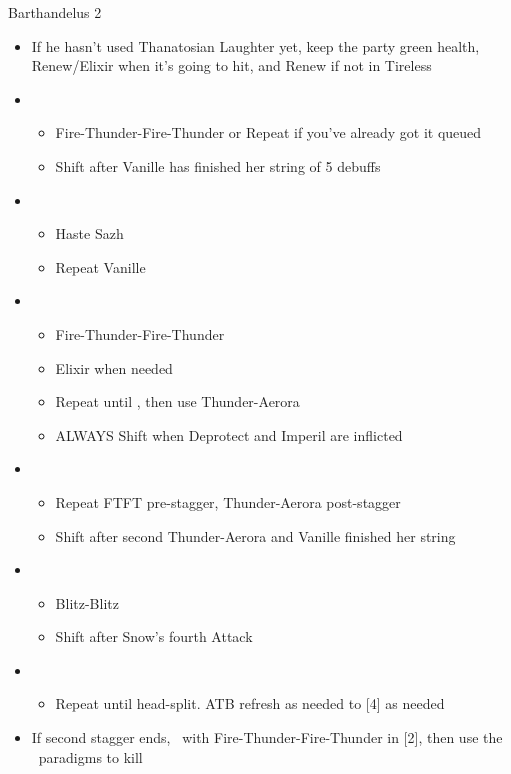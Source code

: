 \begin{paracol}{2}
\begin{battle}{Barthandelus 2}
\begin{itemize}
			\item If he hasn't used Thanatosian Laughter yet, keep the party green health, Renew/Elixir when it's going to hit, and Renew if not in Tireless
			\item \fifth
			      \begin{itemize}
				      \item Fire-Thunder-Fire-Thunder or Repeat if you've already got it queued
				      \item Shift after Vanille has finished her string of 5 debuffs
			      \end{itemize}
			\item \first
			      \begin{itemize}
				      \item Haste Sazh
				      \item Repeat Vanille
			      \end{itemize}
			\item \fifth
			      \begin{itemize}
				      \item Fire-Thunder-Fire-Thunder
				      \item Elixir when needed
				      \item Repeat until \stagger, then use Thunder-Aerora
				      \item ALWAYS Shift when Deprotect and Imperil are inflicted
			      \end{itemize}
			\item \second
			      \begin{itemize}
				      \item Repeat FTFT pre-stagger, Thunder-Aerora post-stagger
				      \item Shift after second Thunder-Aerora and Vanille finished her string
			      \end{itemize}
			\item \fourth
			      \begin{itemize}
				      \item Blitz-Blitz
				      \item Shift after Snow's fourth Attack
			      \end{itemize}
			\item \sixth
			      \begin{itemize}
				      \item Repeat until head-split. ATB refresh as needed to [4] as needed
			      \end{itemize}
			\item If second stagger ends, \stagger\ with \linebreak Fire-Thunder-Fire-Thunder in [2], then use the \com\ paradigms to kill
		\end{itemize}
		\null


\end{battle}
\end{paracol}
